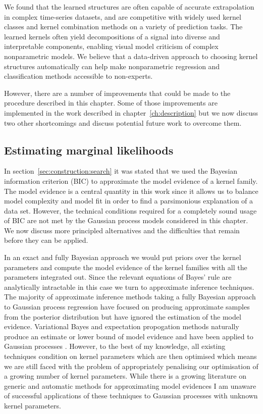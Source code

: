 We found that the learned structures are often capable of accurate extrapolation in complex time-series datasets, and are competitive with widely used kernel classes and kernel combination methods on a variety of prediction tasks.
The learned kernels often yield decompositions of a signal into diverse and interpretable components, enabling visual model criticism of complex nonparametric models.
We believe that a data-driven approach to choosing kernel structures automatically can help make nonparametric regression and classification methods accessible to non-experts.

However, there are a number of improvements that could be made to the procedure described in this chapter.
Some of those improvements are implemented in the work described in chapter~\ref{ch:description} but we now discuss two other shortcomings and discuss potential future work to overcome them.

\subsection{Estimating marginal likelihoods}

In section~\ref{sec:construction:search} it was stated that we used the Bayesian information criterion (BIC) \citep{Schwarz1978-wp} to approximate the model evidence of a kernel family.
The model evidence is a central quantity in this work since it allows us to balance model complexity and model fit in order to find a parsimonious explanation of a data set.
However, the technical conditions required for a completely sound usage of BIC are not met by the Gaussian process models considered in this chapter.
We now discuss more principled alternatives and the difficulties that remain before they can be applied.

In an exact and fully Bayesian approach we would put priors over the kernel parameters and compute the model evidence of the kernel families with all the parameters integrated out.
Since the relevant equations of Bayes' rule are analytically intractable in this case we turn to approximate inference techniques.
The majority of approximate inference methods taking a fully Bayesian approach to Gaussian process regression have focused on producing approximate samples from the posterior distribution \citep[e.g.][]{Murray2010-hv, Lloyd2012-sb, Snoek2012-ri} but have ignored the estimation of the model evidence.
Variational Bayes and expectation propogation methods naturally produce an estimate or lower bound of model evidence and have been applied to Gaussian processes \citep[e.g.][]{Rasmussen2006-ml, Hensman2013-ox}.
However, to the best of my knowledge, all existing techniques condition on kernel parameters which are then optimised which means we are still faced with the problem of appropriately penalising our optimisation of a growing number of kernel parameters.
While there is a growing literature on generic and automatic methods for approximating model evidences \citep[e.g.][]{Skilling2006-ez, Gerrish_undated-zh, Feroz2013-dj} I am unaware of successful applications of these techniques to Gaussian processes with unknown kernel parameters.

